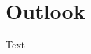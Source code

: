 \documentclass[class=scrbook, crop=false]{standalone}
\begin{document}
\section{Outlook}
\label{Section::Outlook}
    Text
\end{document}
